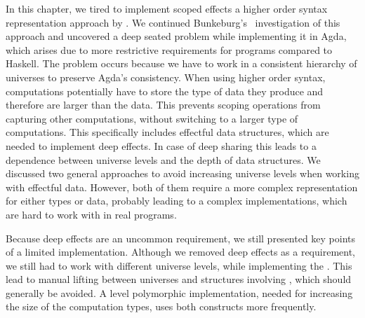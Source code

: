 In this chapter, we tired to implement scoped effects a higher order
syntax representation approach by \textcite{DBLP:conf/haskell/WuSH14}.
We continued Bunkeburg's~\cite{bunkenburg2019modeling} investigation of this
approach and uncovered a deep seated problem while implementing it in Agda,
which arises due to more restrictive requirements for programs compared to
Haskell.
The problem occurs because we have to work in a consistent hierarchy of
universes to preserve Agda's consistency.
When using higher order syntax, computations potentially have to store the type
of data they produce and therefore are larger than the data.
This prevents scoping operations from capturing other computations, without
switching to a larger type of computations.
This specifically includes effectful data structures, which are needed to
implement deep effects.
In case of deep sharing this leads to a dependence between universe levels and
the depth of data structures.
We discussed two general approaches to avoid increasing universe levels when
working with effectful data.
However, both of them require a more complex representation for either types or
data, probably leading to a complex implementations, which are hard to work with
in real programs.

Because deep effects are an uncommon requirement, we still presented key points
of a limited implementation.
Although we removed deep effects as a requirement, we still had to work with
different universe levels, while implementing the .
This lead to manual lifting between universes and structures involving
, which should generally be avoided.
A level polymorphic implementation, needed for increasing the size of the
computation types, uses both constructs more frequently.